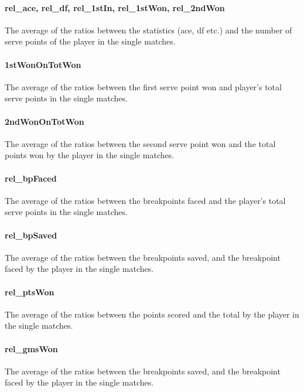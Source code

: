 \documentclass{article}
\begin{document}
\paragraph{rel\_ace, rel\_df, rel\_1stIn, rel\_1stWon, rel\_2ndWon}
The average of the ratios between the statistics (ace, df etc.) and the number of serve points of the player in the single matches.

\paragraph{1stWonOnTotWon}
The average of the ratios between the first serve point won and player's total serve points in the single matches.

\paragraph{2ndWonOnTotWon}
The average of the ratios between the second serve point won and the total points won by the player in the single matches.

\paragraph{rel\_bpFaced}
The average of the ratios between the breakpoints faced and the player's total serve points in the single matches.

\paragraph{rel\_bpSaved}
The average of the ratios between the breakpoints saved, and the breakpoint faced by the player in the single matches.

\paragraph{rel\_ptsWon}
The average of the ratios between the points scored and the total by the player in the single matches.

\paragraph{rel\_gmsWon}
The average of the ratios between the breakpoints saved, and the breakpoint faced by the player in the single matches.
\end{document}
